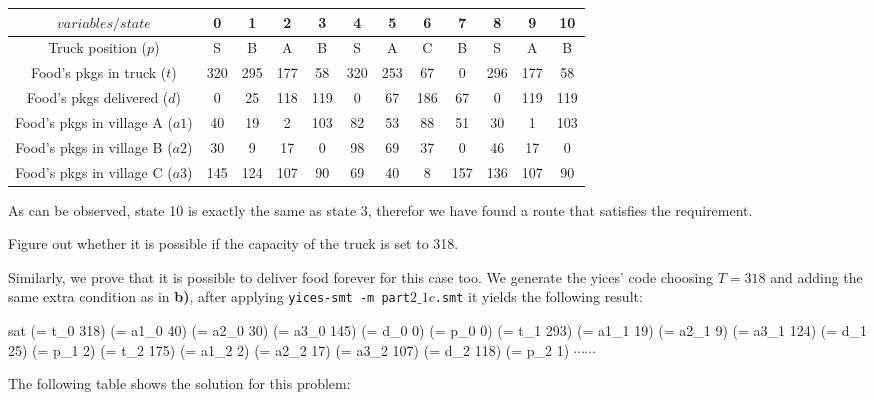 \begin{description}

  \begin{center}
\begin{tabular}{|c|c|c|c|a|c|c|c|c|c|c|a|}
  \hline
  $variables/state$ & 0 & 1 & 2 & 3 & 4 & 5 & 6 & 7 & 8 & 9 & 10  \\
  \hline
  Truck position ($p$) & S & B & A & B & S & A & C & B & S & A & B\\
  Food's pkgs in truck ($t$) & 320 & 295 & 177 & 58 & 320 & 253 & 67 & 0 & 296 & 177 & 58\\
  Food's pkgs delivered ($d$) & 0 & 25 & 118 & 119 & 0 & 67 & 186 & 67 & 0 & 119 & 119\\
  Food's pkgs in village A ($a1$) & 40  & 19  & 2   & 103 & 82 & 53 & 88 & 51  & 30  & 1   & 103 \\
  Food's pkgs in village B ($a2$) & 30  & 9   & 17  & 0   & 98 & 69 & 37 & 0   & 46  & 17  & 0  \\
  Food's pkgs in village C ($a3$) & 145 & 124 & 107 & 90  & 69 & 40 & 8  & 157 & 136 & 107 & 90  \\
  \hline
\end{tabular}
\end{center}

  As can be observed, state 10 is exactly the same as state 3, therefor we have found a route that satisfies the requirement.

  \item[(c)]  Figure out whether it is possible if the capacity of the truck is set to 318.

  Similarly, we prove that it is possible to deliver food forever for this case too. We generate the yices' code choosing $T = 318$ and adding the same extra condition as in \textbf{b)}, after applying {\tt yices-smt -m part$2\_1c$.smt} it yields the following result:

    \selectfont
  {\footnotesize
  \noindent

sat\break
(= t\_0 318)\break
(= a1\_0 40)\break
(= a2\_0 30)\break
(= a3\_0 145)\break
(= d\_0 0)\break
(= p\_0 0)\break
(= t\_1 293)\break
(= a1\_1 19)\break
(= a2\_1 9)\break
(= a3\_1 124)\break
(= d\_1 25)\break
(= p\_1 2)\break
(= t\_2 175)\break
(= a1\_2 2)\break
(= a2\_2 17)\break
(= a3\_2 107)\break
(= d\_2 118)\break
(= p\_2 1)\break
$\cdots \cdots$
  }
  \selectfont
  \vspace{3mm}

  The following table shows the solution for this problem:


\end{description}
